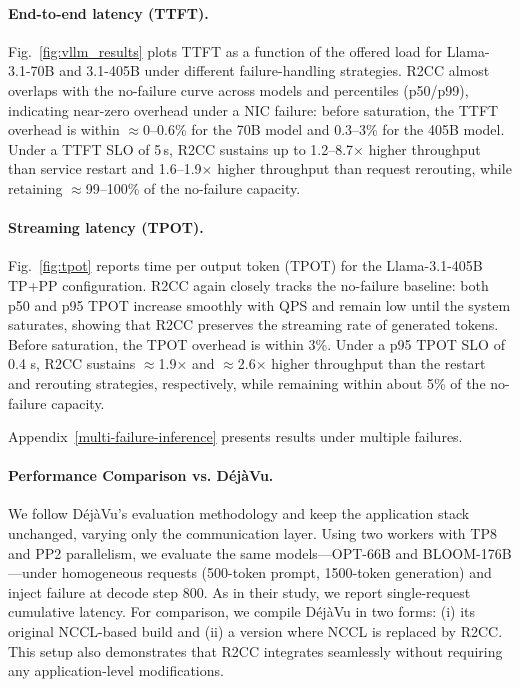 \paragraph{End-to-end latency (TTFT).}
Fig.~\ref{fig:vllm_results} plots TTFT as a function of the offered load for Llama-3.1-70B and 3.1-405B under different failure-handling strategies.
R2CC almost overlaps with the no-failure curve across models and percentiles (p50/p99),
indicating near-zero overhead under a NIC failure: before saturation, the TTFT overhead is within $\approx$0--0.6\% for the 70B model and 0.3--3\% for the 405B model.
Under a TTFT SLO of 5\,s, R2CC sustains up to 1.2--8.7$\times$ higher throughput than service restart and 1.6--1.9$\times$ higher throughput than request rerouting, while retaining $\approx$99–100\% of the no-failure capacity.

\paragraph{Streaming latency (TPOT).}
Fig.~\ref{fig:tpot} reports time per output token (TPOT) for the Llama-3.1-405B TP+PP configuration.
R2CC again closely tracks the no-failure baseline: both p50 and p95 TPOT increase smoothly with QPS and remain low until the system saturates, showing that R2CC preserves the streaming rate of generated tokens.
Before saturation, the TPOT overhead is within 3\%.
Under a p95 TPOT SLO of 0.4 s, R2CC sustains $\approx$1.9× and $\approx$2.6× higher throughput than the restart and rerouting strategies, respectively, while remaining within about 5\% of the no-failure capacity.

Appendix~\ref{multi-failure-inference} presents results under multiple failures.

\paragraph{Performance Comparison vs. DéjàVu.}
We follow DéjàVu's evaluation methodology and keep the application stack unchanged, varying only the communication layer. Using two workers with TP8 and PP2 parallelism, we evaluate the same models—OPT-66B and BLOOM-176B—under homogeneous requests (500-token prompt, 1500-token generation) and inject failure at decode step 800. As in their study, we report single-request cumulative latency. For comparison, we compile DéjàVu in two forms: (i) its original NCCL-based build and (ii) a version where NCCL is replaced by R2CC. This setup also demonstrates that R2CC integrates seamlessly without requiring any application-level modifications.

